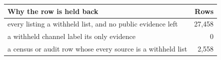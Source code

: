 \begin{tabular}{lr}
\toprule
Why the row is held back & Rows \\
\midrule
every listing a withheld list, and no public evidence left & 27,458 \\
a withheld channel label its only evidence & 0 \\
a census or audit row whose every source is a withheld list & 2,558 \\
\bottomrule
\end{tabular}
